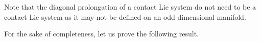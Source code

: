 \documentclass[11pt]{article}
\theoremstyle{plain}
\newtheorem{corollary}[theorem]{Corollary}
\newtheorem{proposition}[theorem]{Proposition}
\theoremstyle{definition}
\begin{document}




Note that the diagonal prolongation of a contact Lie system do not need to be a contact Lie system as it may not be defined on an odd-dimensional manifold.

For the sake of completeness, let us prove the following result.
\end{document}
